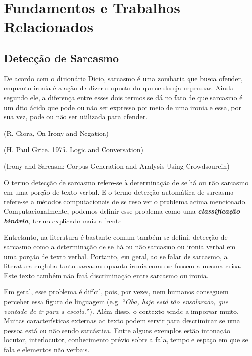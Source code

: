 

\chapter{Fundamentos e Trabalhos Relacionados}%
\label{cha:fundamentos_e_trabalhos_relacionados}

\section{Detecção de Sarcasmo}%
\label{sec:deteccao_de_sarcasmo}

De acordo com o dicionário Dicio, sarcasmo é uma zombaria que busca ofender,
enquanto ironia é a ação de dizer o oposto do que se deseja expressar. Ainda
segundo ele, a diferença entre esses dois termos se dá no fato de que sarcasmo é
um dito ácido que pode ou não ser expresso por meio de uma ironia e essa, por
sua vez, pode ou não ser utilizada para
ofender.~\cite{dicio_sarc, dicio_irony}

(R. Giora, On Irony and Negation)

(H. Paul Grice. 1975. Logic and Conversation)

(Irony and Sarcasm: Corpus Generation and Analysis Using Crowdsourcin)

O termo detecção de sarcasmo refere-se à determinação de se há ou não sarcasmo
em uma porção de texto verbal. E o termo detecção automática de sarcasmo
refere-se a métodos computacionais de se resolver o problema acima mencionado.
Computacionalmente, podemos definir esse problema como uma
\textit{\textbf{classificação binária}}, termo explicado mais a frente.

Entretanto, na literatura é bastante comum também se definir detecção de
sarcasmo como a determinação de se há ou não sarcasmo ou ironia verbal em uma
porção de texto verbal. Portanto, em geral, ao se falar de sarcasmo, a
literatura engloba tanto sarcasmo quanto ironia como se fossem a mesma coisa.
Este texto também não fará discriminação entre sarcasmo ou ironia.

Em geral, esse problema é difícil, pois, por vezes, nem humanos conseguem
perceber essa figura de linguagem (e.g. ``\textit{Oba, hoje está tão ensolarado,
que vontade de ir para a escola.}''). Além disso, o contexto tende a importar
muito. Muitas características externas ao texto podem servir para descriminar se
uma pessoa está ou não sendo sarcástica. Entre alguns exemplos estão intonação,
locutor, interlocutor, conhecimento prévio sobre a fala, tempo e espaço em que
se fala e elementos não verbais.~\cite{wallace-etal:2014:ironic-context}

